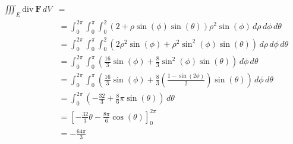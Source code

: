 \documentclass[letter,11pt]{article}
\begin{document}
\begin{align*}
    \iiint_{E}  \mathrm{div}~\mathbf{F} \, dV &=\\
    &= \int_{0}^{2\pi}\int_{0}^{\pi}\int_{0}^{2}\left(2+\rho\sin\left(\phi\right)\sin\left(\theta\right)\right)\rho^{2}\sin\left(\phi\right)\,d\rho \,d\phi\, d\theta\\
    &= \int_{0}^{2\pi}\int_{0}^{\pi}\int_{0}^{2}\left(2\rho^{2}\sin\left(\phi\right)+\rho^{2}\sin^{2}\left(\phi\right)\sin\left(\theta\right)\right)\,d\rho \,d\phi\, d\theta\\
    &= \int_{0}^{2\pi}\int_{0}^{\pi}\left(\frac{16}{3}\sin\left(\phi\right)+\frac{8}{3}\sin^{2}\left(\phi\right)\sin\left(\theta\right)\right)\,d\phi\, d\theta\\
    &= \int_{0}^{2\pi}\int_{0}^{\pi}\left(\frac{16}{3}\sin\left(\phi\right)+\frac{8}{3}\left(\frac{1-\sin\left(2\phi\right)}{2}\right)\sin\left(\theta\right)\right)\,d\phi\, d\theta\\
    &= \int_{0}^{2\pi}\left(-\frac{32}{3}+\frac{8}{6}\pi\sin\left(\theta\right)\right)\,d\theta\\
    &= \left[-\frac{32}{3}\theta-\frac{8\pi}{6}\cos\left(\theta\right)\right]_{0}^{2\pi} \\
    &= \boxed{-\frac{64\pi}{3}}
\end{align*}
\end{document}
